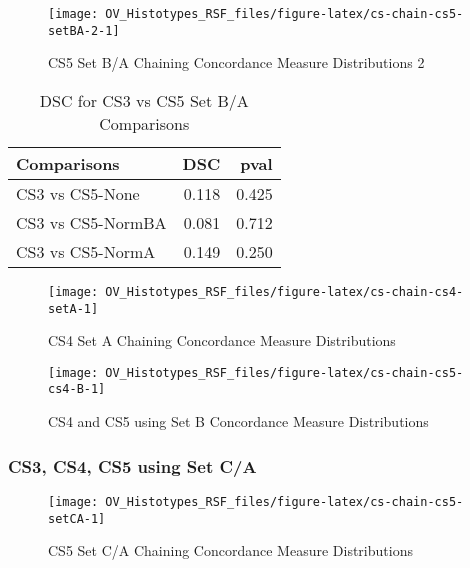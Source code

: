 \documentclass[
]{report}
\begin{document}
\begin{figure}[H]

{\centering \texttt{[image: OV\_Histotypes\_RSF\_files/figure-latex/cs-chain-cs5-setBA-2-1]} 

}

\caption{CS5 Set B/A Chaining Concordance Measure Distributions 2}\label{fig:cs-chain-cs5-setBA-2}
\end{figure}

\begin{table}

\caption{\label{tab:cs35-BA-dsc}DSC for CS3 vs CS5 Set B/A Comparisons}
\centering
\begin{tabular}[t]{l|r|r}
\hline
Comparisons & DSC & pval\\
\hline
CS3 vs CS5-None & 0.118 & 0.425\\
\hline
CS3 vs CS5-NormBA & 0.081 & 0.712\\
\hline
CS3 vs CS5-NormA & 0.149 & 0.250\\
\hline
\end{tabular}
\end{table}

\begin{figure}[H]

{\centering \texttt{[image: OV\_Histotypes\_RSF\_files/figure-latex/cs-chain-cs4-setA-1]} 

}

\caption{CS4 Set A Chaining Concordance Measure Distributions}\label{fig:cs-chain-cs4-setA}
\end{figure}

\begin{figure}[H]

{\centering \texttt{[image: OV\_Histotypes\_RSF\_files/figure-latex/cs-chain-cs5-cs4-B-1]} 

}

\caption{CS4 and CS5 using Set B Concordance Measure Distributions}\label{fig:cs-chain-cs5-cs4-B}
\end{figure}

\hypertarget{cs3-cs4-cs5-using-set-ca}{%
\subsubsection{CS3, CS4, CS5 using Set C/A}\label{cs3-cs4-cs5-using-set-ca}}

\begin{figure}[H]

{\centering \texttt{[image: OV\_Histotypes\_RSF\_files/figure-latex/cs-chain-cs5-setCA-1]} 

}

\caption{CS5 Set C/A Chaining Concordance  Measure Distributions}\label{fig:cs-chain-cs5-setCA}
\end{figure}
\end{document}
